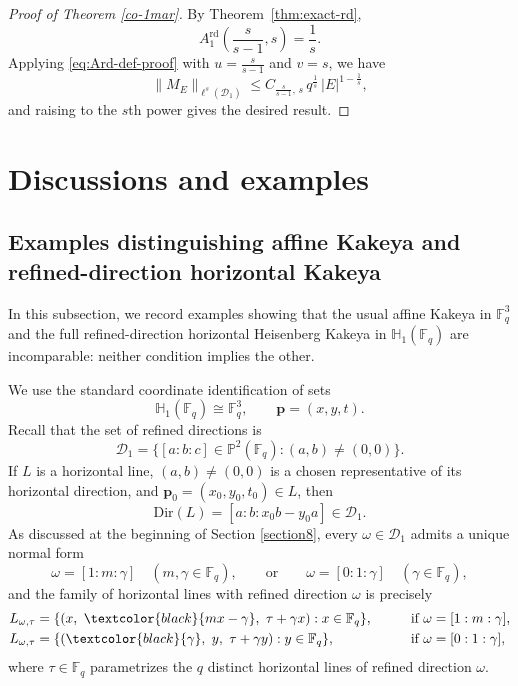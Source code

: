 \documentclass[11pt]{article}
\newcommand{\1}{\mathbf 1}
\begin{document}
\begin{proof}[Proof of Theorem \ref{co-1mar}]
By Theorem~\ref{thm:exact-rd},
\[
A^{\mathrm{rd}}_1\!\left(\frac{s}{s-1},s\right)=\frac1s.
\]
Applying \eqref{eq:Ard-def-proof} with
$u=\frac{s}{s-1}$ and $v=s$, we have
\[
\|M_E\|_{\ell^s(\mathcal D_1)}
\le
C_{\frac{s}{s-1},\,s}\,q^{\frac{1}{s}}\,|E|^{1-\frac{1}{s}},
\]
and raising to the $s$th power gives the desired result.
\end{proof}

\section{Discussions and examples}\label{section11}
\subsection{Examples distinguishing affine Kakeya and refined-direction horizontal Kakeya}
\label{sec:examples-affine-vs-refined}

In this subsection, we record examples showing that the usual affine Kakeya in $\mathbb{F}_q^3$ and the full
refined-direction horizontal Heisenberg Kakeya in $\mathbb{H}_1(\mathbb{F}_q)$ are
incomparable: neither condition implies the other.

We use the standard coordinate identification of sets
\[
\mathbb{H}_1(\mathbb{F}_q)\cong \mathbb{F}_q^3,\qquad \mathbf{p}=(x,y,t).
\]
Recall that the set of refined directions is
\[
\mathcal{D}_1=\{[a:b:c]\in\mathbb{P}^2(\mathbb{F}_q): (a,b)\neq (0,0)\}.
\]
{ 
If \(L\) is a horizontal line, \((a,b)\neq(0,0)\) is a chosen representative of its horizontal direction, and \(\mathbf p_0=(x_0,y_0,t_0)\in L\), then
\[
\mathrm{Dir}(L)=[a:b:x_0b-y_0a]\in\mathcal{D}_1.
\]
}
As discussed at the beginning of Section \ref{section8}, every $\omega\in\mathcal{D}_1$ admits a unique
normal form
\[
\omega=[1:m:\gamma]\quad (m,\gamma\in\mathbb{F}_q),
\qquad\text{or}\qquad
\omega=[0:1:\gamma]\quad (\gamma\in\mathbb{F}_q),
\]
and the family of horizontal lines with refined direction $\omega$ is precisely
\begin{align*}
L_{\omega,\tau}
&=\{(x,\ \textcolor{black}{mx-\gamma},\ \tau+\gamma x): x\in\mathbb{F}_q\},
\qquad &&\text{if }\omega=[1:m:\gamma],\\
L_{\omega,\tau}
&=\{(\textcolor{black}{\gamma},\ y,\ \tau+\gamma y): y\in\mathbb{F}_q\},
\qquad &&\text{if }\omega=[0:1:\gamma],
\end{align*}
where $\tau\in\mathbb{F}_q$ parametrizes the $q$ distinct horizontal lines of refined direction $\omega$.
\end{document}

